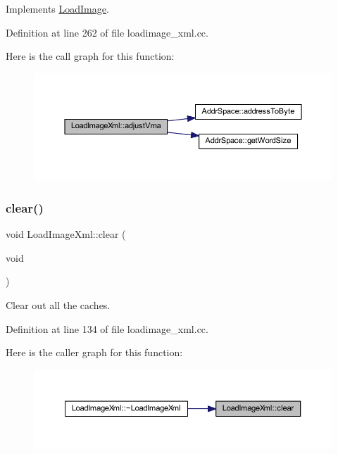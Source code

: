 Implements \mbox{\hyperlink{class_load_image_a51a254f705fba6f0e6524995acd5aaa7}{Load\+Image}}.



Definition at line 262 of file loadimage\+\_\+xml.\+cc.

Here is the call graph for this function\+:
\nopagebreak
\begin{figure}[H]
\begin{center}
\leavevmode
\includegraphics[width=350pt]{class_load_image_xml_ab6a98e9bcf8141caee525fefc6a6d115_cgraph}
\end{center}
\end{figure}
\mbox{\label{class_load_image_xml_a609c3c7c8ae8d9a4152ceb83aad0e862}} 
\subsubsection{\texorpdfstring{clear()}{clear()}}
{\footnotesize\ttfamily void Load\+Image\+Xml\+::clear (\begin{DoxyParamCaption}\item[{void}]{ }\end{DoxyParamCaption})}



Clear out all the caches. 



Definition at line 134 of file loadimage\+\_\+xml.\+cc.

Here is the caller graph for this function\+:
\nopagebreak
\begin{figure}[H]
\begin{center}
\leavevmode
\includegraphics[width=350pt]{class_load_image_xml_a609c3c7c8ae8d9a4152ceb83aad0e862_icgraph}
\end{center}
\end{figure}
\mbox{\label{class_load_image_xml_ad6b8dd51035746be7a59e1070e65c668}} 
